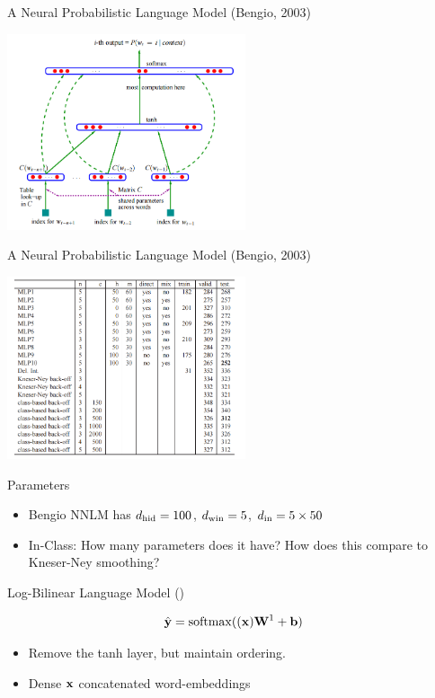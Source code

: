 \documentclass{beamer}
\begin{document}
\begin{frame}{A Neural Probabilistic Language Model (Bengio, 2003)}  
  \begin{center}
    \includegraphics[width=7cm]{bengio}
  \end{center}
\end{frame}



\begin{frame}{A Neural Probabilistic Language Model (Bengio, 2003)}  
  \begin{center}
    \includegraphics[width=7cm]{bengioresults}
  \end{center}
\end{frame}

\begin{frame}{Parameters}
  \begin{itemize}
  \item Bengio NNLM has ${d_{\mathrm{hid}}}=100$, ${d_{\mathrm{win}}}=5$, ${d_{\mathrm{in}}} = 5 \times 50 $ 
    \air 
    
  \item In-Class: How many parameters does it have? How does this compare to Kneser-Ney smoothing?
  \end{itemize}

\end{frame}


\begin{frame}{Log-Bilinear Language Model ()}

  \[\hat{\boldy} = \softmax((\boldx)\boldW^1 + \boldb)\]

  \begin{itemize}
  \item Remove the tanh layer, but maintain ordering.
    \air 

  \item Dense $\mathbf{x}$ concatenated word-embeddings
  \end{itemize}
\end{frame}
\end{document}
